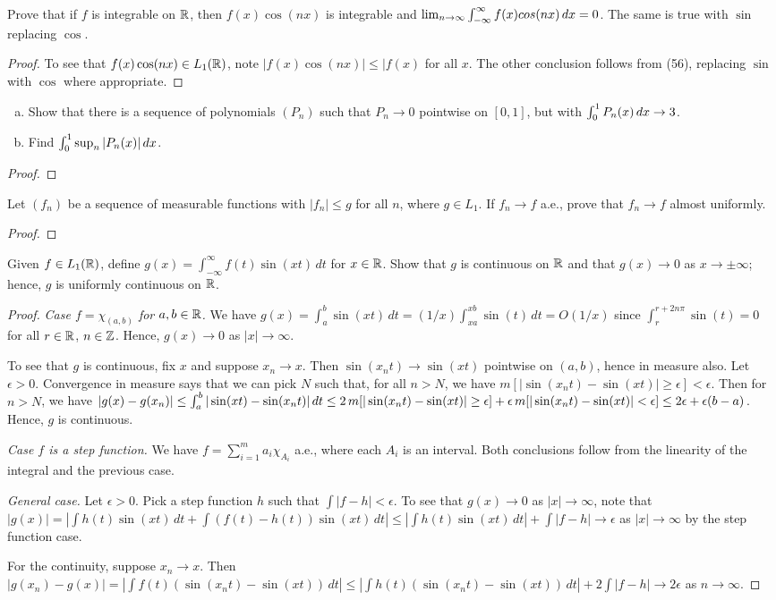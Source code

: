 \documentclass{article}
\begin{document}
 Prove that if $f$ is integrable on $\mathbb{R}$, then $f(x) \cos(nx)$ is integrable and $\lim_{n\to\infty} \int_{-\infty}^\infty f(x) cos(nx) \,dx = 0$. The same is true with $\sin$ replacing $\cos$.
\begin{proof}
To see that $f(x) \cos(nx) \in L_1(\mathbb{R})$, note $|f(x)\cos(nx)| \le |f(x)$ for all $x$. The other conclusion follows from (56), replacing $\sin$ with $\cos$ where appropriate.

\end{proof}
 \begin{enumerate}[(a)]
\item Show that there is a sequence of polynomials $(P_n)$ such that $P_n \to 0$ pointwise on $[0,1]$, but with $\int_0^1 P_n(x)\,dx \to 3$.
\item Find $\int_0^1 \sup_n |P_n(x)|\,dx$.
\end{enumerate}
\begin{proof}
\end{proof}
 Let $(f_n)$ be a sequence of measurable functions with $|f_n| \le g$ for all $n$, where $g\in L_1$. If $f_n \to f$ a.e., prove that $f_n \to f$ almost uniformly.
\begin{proof}
\end{proof}
 Given $f\in L_1(\mathbb{R})$, define $g(x) = \int_{-\infty}^\infty f(t) \sin(xt) \,dt$ for $x\in\mathbb{R}$. Show that $g$ is continuous on $\mathbb{R}$ and that $g(x) \to 0$ as $x \to \pm \infty$; hence, $g$ is uniformly continuous on $\mathbb{R}$.
\begin{proof}

\emph{Case $f = \chi_{(a,b)}$ for $a,b \in \mathbb{R}$.} We have $g(x) = \int_a^b \sin(xt) \,dt = (1/x) \int_{xa}^{xb} \sin(t) \, dt = O(1/x)$ since $\int_r^{r+2n\pi} \sin(t) = 0$ for  all $r \in \mathbb{R}$, $n \in \mathbb{Z}$. Hence, $g(x) \to 0$ as $|x| \to \infty$.  

To see that $g$ is continuous, fix $x$ and suppose $x_n \to x$.  Then $\sin(x_nt) \to\sin(xt)$ pointwise on $(a,b)$, hence in measure also.  Let $\epsilon > 0$. Convergence in measure says that we can pick $N$ such that, for all $n > N$, we have $m[|\sin(x_nt) - \sin(xt)| \ge \epsilon] < \epsilon$.  Then for $n > N$, we have $|g(x) - g(x_n)| \le \int_a^b |\sin(xt) - \sin(x_nt)| \,dt 
\le 2 \,m[|\sin(x_nt) - \sin(xt)| \ge \epsilon] + \epsilon \,m[|\sin(x_nt) - \sin(xt)| < \epsilon] \le 2\epsilon + \epsilon(b-a)$. Hence, $g$ is continuous.

\emph{Case $f$ is a step function.} We have $f = \sum_{i=1}^m a_i \chi_{A_i}$ a.e., where each $A_i$ is an interval. Both conclusions follow from the linearity of the integral and the previous case.

\emph{General case.} Let $\epsilon > 0$. Pick a step function $h$ such that $\int|f-h| < \epsilon$. To see that $g(x) \to 0$ as $|x| \to \infty$, note that
$|g(x)| = |\int h(t) \sin(xt) \,dt + \int (f(t) - h(t)) \sin(xt) \,dt| \le |\int h(t) \sin(xt) \,dt| + \int |f - h| \to \epsilon$ as $|x| \to \infty$ by the step function case. 

For the continuity, suppose $x_n\to x$. Then $|g(x_n) - g(x)| = |\int f(t) (\sin(x_nt) - \sin(xt)) \,dt| \le  |\int h(t) (\sin(x_nt) - \sin(xt)) \,dt| + 2 \int |f - h|
\to 2\epsilon$ as $n \to \infty$.
\end{proof}
\end{document}
